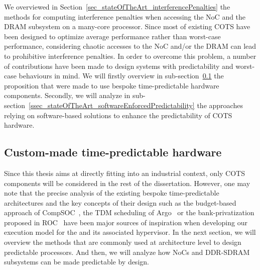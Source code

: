\documentclass[main.tex]{subfiles}
\begin{document}
We overviewed in Section~\ref{sec_stateOfTheArt_interferencePenalties} the
methods for computing interference penalties when accessing the NoC and the
DRAM subsystem on a many-core processor. Since most of existing COTS have been
designed to optimize average performance rather than worst-case performance,
considering chaotic accesses to the NoC and/or the DRAM can lead to prohibitive
interference penalties.  In order to overcome this problem, a number of
contributions have been made to design systems with predictability and
worst-case behaviours in mind. We will firstly overview in
sub-section~\ref{ssec_stateOfTheArt_customHW} the proposition that were made to
use bespoke time-predictable hardware components. Secondly, we will analyze  in
sub-section~\ref{ssec_stateOfTheArt_softwareEnforcedPredictability} the
approaches relying on software-based solutions to enhance the predictability of
COTS hardware.


\subsection{Custom-made time-predictable hardware}
\label{ssec_stateOfTheArt_customHW}

Since this thesis aims at directly fitting into an industrial context, only
COTS components will be considered in the rest of the dissertation. However,
one may note that the precise analysis of the existing bespoke time-predictable
architectures and the key concepts of their design such as the budget-based
approach of CompSOC~\cite{Goossens2013}, the TDM scheduling of
Argo~\cite{Kasapaki14} or the bank-privatization proposed in
ROC~\cite{Krishnapillai2014} have been major sources of inspiration when
developing our execution model for the \mppalong and its associated hypervisor.
In the next section, we will overview the methods that are commonly used at
architecture level to design predictable processors. And then, we will analyze
how NoCs and DDR-SDRAM subsystems can be made predictable by design.
\end{document}
